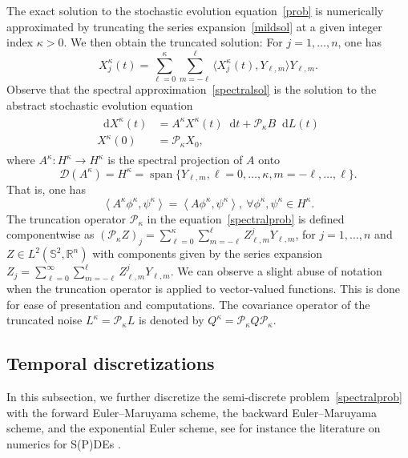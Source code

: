 \documentclass[11pt]{amsart}
\newcommand{\R}{{\mathbb R}}
\newcommand{\IS}{\mathbb{S}}
\newcommand*\dd{\mathop{}\!\mathrm{d}}
\newcommand{\cP}{\mathcal{P}}
\DeclareMathOperator{\spn}{span}
\begin{document}
The exact solution to the stochastic evolution equation~\eqref{prob} is numerically approximated 
by truncating the series
expansion~\eqref{mildsol} at a given integer index $\kappa>0$. We then obtain the truncated solution: For $j=1,\ldots,n$, one has  
\begin{equation}\label{spectralsol}
X_j^\kappa(t)=\sum_{\ell=0}^\kappa\sum_{m=-\ell}^\ell\langle X_j^\kappa(t),Y_{\ell,m} \rangle Y_{\ell,m}. 
\end{equation}
Observe that the spectral approximation~\eqref{spectralsol} is the solution to the abstract stochastic evolution equation
\begin{align}
    \begin{split}
    \label{spectralprob}
\dd X^\kappa(t)&=A^\kappa X^\kappa(t)\dd t+\cP_\kappa B\dd L(t)\\
X^\kappa(0)&=\cP_\kappa X_0,
    \end{split}
\end{align}
where $A^\kappa\colon H^\kappa \to H^\kappa$ is the spectral projection of $A$
onto $$\mathcal D(A^\kappa) = H^\kappa= \spn\{Y_{\ell , m}, \ell = 0 , \dots, \kappa, m = -\ell, \dots, \ell\}.$$ That is, one has
$$
\left<A^\kappa\phi^\kappa,\psi^\kappa\right>=
\left<A\phi^\kappa,\psi^\kappa\right>,\ \forall\phi^\kappa,\psi^\kappa\in H^\kappa.
$$
The truncation operator $\cP_\kappa$ in the equation~\eqref{spectralprob} is defined componentwise as
$(\displaystyle\cP_\kappa Z)_j=\sum_{\ell=0}^\kappa\sum_{m=-\ell}^\ell Z^j_{\ell,m} Y_{\ell,m}$, for $j=1,\dots,n$ and $Z\in L^2(\IS^2,\R^n)$ with components given by the series expansion $\displaystyle Z_j=\sum_{\ell=0}^\infty\sum_{m=-\ell}^\ell Z^j_{\ell,m} Y_{\ell,m}$.
We can observe a slight abuse of notation when the truncation operator is applied to vector-valued functions. This is done for ease of presentation and computations.
The covariance operator of the truncated noise $L^\kappa = \cP_\kappa L$ is denoted by
$Q^\kappa = \cP_\kappa Q \cP_\kappa.$

\subsection{Temporal discretizations}
In this subsection, we further discretize  the semi-discrete problem~\eqref{spectralprob}
with the forward Euler--Maruyama scheme, the backward Euler--Maruyama scheme, and
the exponential Euler scheme, see for instance the literature on numerics for S(P)DEs
\cite{MR1214374, Lord_Powell_Shardlow_2014, MR4369963}.
\end{document}

